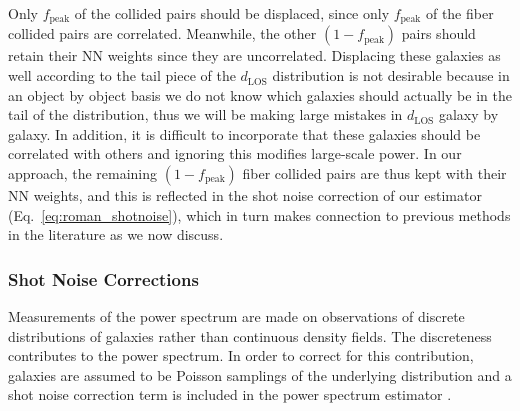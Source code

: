 

Only $f_\mathrm{peak}$ of the 
collided pairs should be displaced, since only $f_\mathrm{peak}$ of the fiber 
collided pairs are correlated. Meanwhile, the other $(1-f_\mathrm{peak})$ pairs 
should retain their NN weights since they are uncorrelated. Displacing these galaxies as well according to the tail piece of the $d_{\mathrm{LOS}}$ distribution is not desirable because  in an object by object basis we do not know which galaxies should actually be in the tail of the distribution, thus we will be making large mistakes in $d_{\mathrm{LOS}}$ galaxy by galaxy. In addition, it is difficult to incorporate that these galaxies should be correlated with others and ignoring this modifies large-scale power. In our approach, the remaining $(1 - f_\mathrm{peak})$ fiber collided pairs are thus kept with their NN weights, and this is reflected in the shot noise correction of our estimator (Eq.~\ref{eq:roman_shotnoise}), which in turn makes connection to previous methods in the literature as we now discuss.



\subsubsection{Shot Noise Corrections} \label{sec:shotnoise} 
Measurements of the power spectrum are made on observations of discrete 
distributions of galaxies rather than continuous density fields. The 
discreteness contributes to the power spectrum. In order to correct for 
this contribution, galaxies are assumed to be Poisson samplings of the 
underlying distribution and a shot noise correction term 
is included in the power spectrum estimator \citep{Peebles:1980aa, Feldman:1994aa}. 

